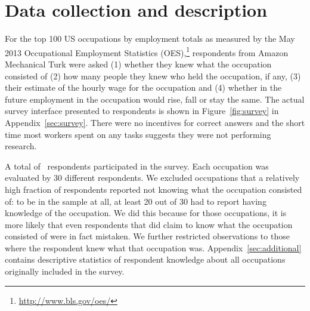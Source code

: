 \documentclass[12pt]{article}
\begin{document}

\section{Data collection and description} 

For the top 100 US occupations by employment totals as measured by the May 2013 Occupational Employment Statistics (OES),\footnote{\url{http://www.bls.gov/oes/}}  respondents from Amazon Mechanical Turk were asked
(1) whether they knew what the occupation consisted of 
(2) how many people they knew who held the occupation, if any,  
(3) their estimate of the hourly wage for the occupation
and (4) whether in the future employment in the occupation would rise, fall or stay the same.
The actual survey interface presented to respondents is shown in Figure~\ref{fig:survey} in Appendix~\ref{sec:survey}. 
There were no incentives for correct answers and the short time most workers spent on any tasks suggests they were not performing research. 

A total of \numRaters\, respondents participated in the survey. 
Each occupation was evaluated by 30 different respondents. 
We excluded occupations that a relatively high fraction of respondents reported not knowing what the occupation consisted of: 
to be in the sample at all, at least 20 out of 30 had to report having knowledge of the occupation.
We did this because for those occupations, it is more likely that even respondents that did claim to know what the occupation consisted of were in fact mistaken.  
We further restricted observations to those where the respondent knew what that occupation was. 
Appendix~\ref{sec:additional} contains descriptive statistics of respondent knowledge about all occupations originally included in the survey.   
\end{document}
